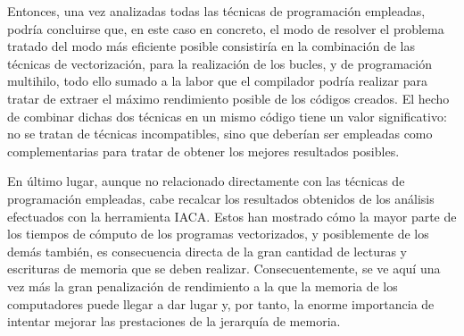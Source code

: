\documentclass[conference]{IEEEtran}
\begin{document}
Entonces, una vez analizadas todas las técnicas de programación empleadas, podría concluirse que, en este caso en concreto, el modo de resolver el problema tratado del modo más eficiente posible consistiría en la combinación de las técnicas de vectorización, para la realización de los bucles, y de programación multihilo, todo ello sumado a la labor que el compilador podría realizar para tratar de extraer el máximo rendimiento posible de los códigos creados. El hecho de combinar dichas dos técnicas en un mismo código tiene un valor significativo: no se tratan de técnicas incompatibles, sino que deberían ser empleadas como complementarias para tratar de obtener los mejores resultados posibles.

En último lugar, aunque no relacionado directamente con las técnicas de programación empleadas, cabe recalcar los resultados obtenidos de los análisis efectuados con la herramienta IACA. Estos han mostrado cómo la mayor parte de los tiempos de cómputo de los programas vectorizados, y posiblemente de los demás también, es consecuencia directa de la gran cantidad de lecturas y escrituras de memoria que se deben realizar. Consecuentemente, se ve aquí una vez más la gran penalización de rendimiento a la que la memoria de los computadores puede llegar a dar lugar y, por tanto, la enorme importancia de intentar mejorar las prestaciones de la jerarquía de memoria.
\end{document}
